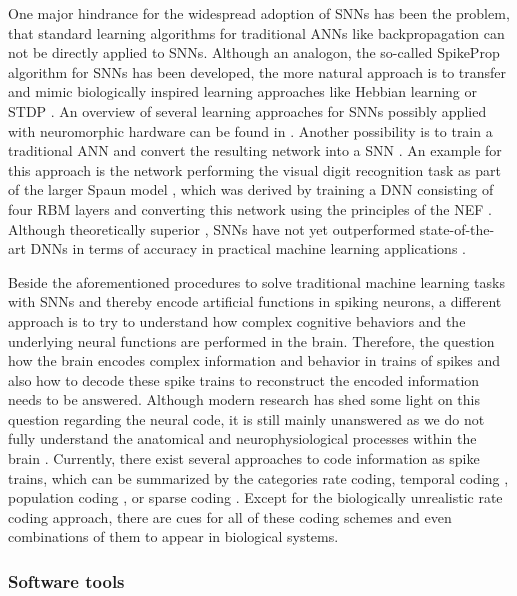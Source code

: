 One major hindrance for the widespread adoption of \acp{SNN} has been the problem, that standard learning algorithms for traditional \acp{ANN} like backpropagation \cite{Werbos1974} can not be directly applied to \acp{SNN}.
Although an analogon, the so-called SpikeProp algorithm \cite{Bohte2002} for \acp{SNN} has been developed, the more natural approach is to transfer and mimic biologically inspired learning approaches like Hebbian learning \cite{Hebb1949} or \ac{STDP} \cite{Bi2001}.
An overview of several learning approaches for \acp{SNN} possibly applied with neuromorphic hardware can be found in \cite{Walter2015}.
Another possibility is to train a traditional \ac{ANN} and convert the resulting network into a \ac{SNN} \cite{Diehl2015, Hunsberger2015}.
An example for this approach is the network performing the visual digit recognition task as part of the larger \ac{Spaun} model \cite{Eliasmith2012}, which was derived by training a \ac{DNN} consisting of four \ac{RBM} layers and converting this network using the principles of the \ac{NEF} \cite{Eliasmith2003}.
Although theoretically superior \cite{Maass1997}, \acp{SNN} have not yet outperformed state-of-the-art \acp{DNN} in terms of accuracy in practical machine learning applications \cite{Schmidhuber2015}.

Beside the aforementioned procedures to solve traditional machine learning tasks with \acp{SNN} and thereby encode artificial functions in spiking neurons, a different approach is to try to understand how complex cognitive behaviors and the underlying neural functions are performed in the brain.
Therefore, the question how the brain encodes complex information and behavior in trains of spikes and also how to decode these spike trains to reconstruct the encoded information needs to be answered.
Although modern research has shed some light on this question regarding the neural code, it is still mainly unanswered as we do not fully understand the anatomical and neurophysiological processes within the brain \cite{Stanley2013}.
Currently, there exist several approaches to code information as spike trains, which can be summarized by the categories rate coding, temporal coding \cite[Chap. 7.6]{Gerstner2014}, population coding \cite[Chap. 1]{Gerstner2002}, \cite{Ponulak2011, Boerlin2011} or sparse coding \cite{Olshausen1996}.
Except for the biologically unrealistic rate coding approach, there are cues for all of these coding schemes and even combinations \cite{Gupta2014} of them to appear in biological systems.

\subsubsection{Software tools}

